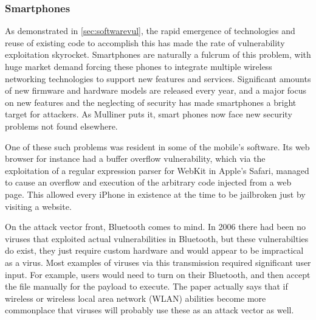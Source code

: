 \documentclass[a4paper, 11pt]{article}
\begin{document}
\subsubsection{Smartphones}
\label{sec:smartphones}
As demonstrated in \ref{sec:softwarevul}, the rapid emergence of technologies and reuse of existing code to accomplish this has made the rate of vulnerability exploitation skyrocket. \cite{ref:jang2014survey} Smartphones are naturally a fulcrum of this problem, with huge market demand forcing these phones to integrate multiple wireless networking technologies to support new features and services. \cite{ref:mulliner2006security} Significant amounts of new firmware and hardware models are released every year, and a major focus on new features and the neglecting of security has made smartphones a bright target for attackers. \cite{ref:mulliner2006security} As Mulliner \cite{ref:mulliner2006security} puts it, smart phones now face new security problems not found elsewhere.

One of these such problems was resident in some of the mobile's software. Its web browser for instance had a buffer overflow vulnerability, which via the exploitation of a regular expression parser for WebKit in Apple's Safari, managed to cause an overflow and execution of the arbitrary code injected from a web page. \cite{ref:dunham2008mobile} This allowed every iPhone in existence at the time to be jailbroken just by visiting a website.

On the attack vector front, Bluetooth comes to mind. In 2006 there had been no viruses that exploited actual vulnerabilities in Bluetooth, but these vulnerabilties do exist, they just require custom hardware and would appear to be impractical as a virus. \cite{ref:toyssy2006malicious} Most examples of viruses via this transmission required significant user input. For example, users would need to turn on their Bluetooth, and then accept the file manually for the payload to execute. The paper actually says that if wireless or wireless local area network (WLAN) abilities become more commonplace that viruses will probably use these as an attack vector as well.
\end{document}
